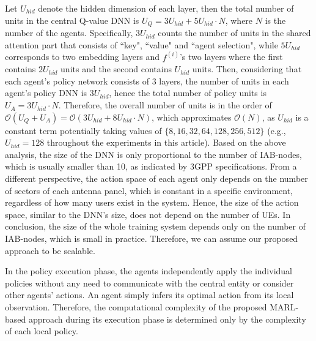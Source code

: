 Let $U_{hid}$ denote the hidden dimension of each layer, then the total number of units in the central Q-value DNN is $U_Q=3U_{hid} + 5U_{hid} \cdot N$, where $N$ is the number of the agents. Specifically, $3U_{hid}$ counts the number of units in the shared attention part that consists of ``key", ``value" and ``agent selection", while $5U_{hid}$ corresponds to two embedding layers and $f^{(i)}$'s two layers where the first contains $2U_{hid}$ units and the second contains $U_{hid}$ units. Then, considering that each agent's policy network consists of 3 layers, the number of units in each agent's policy DNN is $3U_{hid}$, hence the total number of policy units is $U_A = 3U_{hid}\cdot N$. Therefore, the overall number of units is in the order of $\mathcal{O}(U_Q+U_A) = \mathcal{O}(3U_{hid}+8U_{hid}\cdot N)$, which approximates $\mathcal{O}(N)$, as $U_{hid}$ is a constant term potentially taking values of $\{8,16,32,64,128,256,512\}$ (e.g., $U_{hid}=128$ throughout the experiments in this article).
Based on the above analysis, the size of the DNN is only proportional to the number of IAB-nodes, which is usually smaller than 10, as indicated by 3GPP specifications.
From a different perspective, the action space of each agent only depends on the number of sectors of each antenna panel, which is constant in a specific environment, regardless of how many users exist in the system. Hence, the size of the action space, similar to the DNN's size, does not depend on the number of UEs.
In conclusion, the size of the whole training system depends only on the number of IAB-nodes, which is small in practice. Therefore, we can assume our proposed approach to be scalable.

In the policy execution phase, the agents independently apply the individual policies without any need to communicate with the central entity or consider other agents' actions. An agent simply infers its optimal action from its local observation. Therefore, the computational complexity of the proposed MARL-based approach during its execution phase is determined only by the complexity of each local policy.